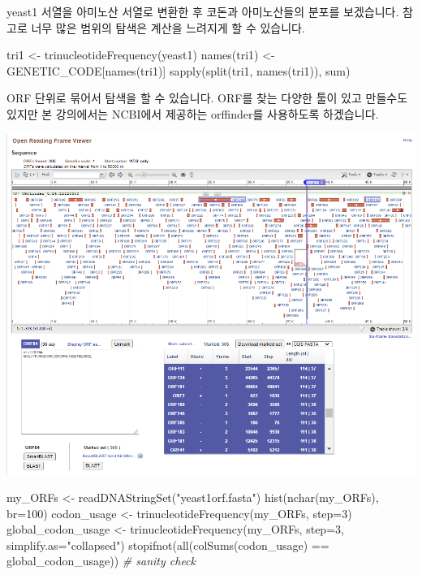 \documentclass[
]{book}
\newenvironment{Shaded}{\begin{snugshade}}{\end{snugshade}}
\newcommand{\AttributeTok}[1]{\textcolor[rgb]{0.77,0.63,0.00}{#1}}
\newcommand{\CommentTok}[1]{\textcolor[rgb]{0.56,0.35,0.01}{\textit{#1}}}
\newcommand{\DecValTok}[1]{\textcolor[rgb]{0.00,0.00,0.81}{#1}}
\newcommand{\FunctionTok}[1]{\textcolor[rgb]{0.00,0.00,0.00}{#1}}
\newcommand{\NormalTok}[1]{#1}
\newcommand{\OtherTok}[1]{\textcolor[rgb]{0.56,0.35,0.01}{#1}}
\newcommand{\SpecialCharTok}[1]{\textcolor[rgb]{0.00,0.00,0.00}{#1}}
\newcommand{\StringTok}[1]{\textcolor[rgb]{0.31,0.60,0.02}{#1}}
\begin{document}
yeast1 서열을 아미노산 서열로 변환한 후 코돈과 아미노산들의 분포를 보겠습니다. 참고로 너무 많은 범위의 탐색은 계산을 느려지게 할 수 있습니다.

\begin{Shaded}
\begin{Highlighting}[]
\NormalTok{tri1 }\OtherTok{\textless{}{-}} \FunctionTok{trinucleotideFrequency}\NormalTok{(yeast1)}
\FunctionTok{names}\NormalTok{(tri1) }\OtherTok{\textless{}{-}}\NormalTok{ GENETIC\_CODE[}\FunctionTok{names}\NormalTok{(tri1)]}
\FunctionTok{sapply}\NormalTok{(}\FunctionTok{split}\NormalTok{(tri1, }\FunctionTok{names}\NormalTok{(tri1)), sum) }
\end{Highlighting}
\end{Shaded}

ORF 단위로 묶어서 탐색을 할 수 있습니다. ORF를 찾는 다양한 툴이 있고 만들수도 있지만 본 강의에서는 NCBI에서 제공하는 orffinder를 사용하도록 하겠습니다.

\includegraphics{images/orffinder.PNG}

\begin{Shaded}
\begin{Highlighting}[]
\NormalTok{my\_ORFs }\OtherTok{\textless{}{-}} \FunctionTok{readDNAStringSet}\NormalTok{(}\StringTok{"yeast1orf.fasta"}\NormalTok{)}
\FunctionTok{hist}\NormalTok{(}\FunctionTok{nchar}\NormalTok{(my\_ORFs), }\AttributeTok{br=}\DecValTok{100}\NormalTok{)}
\NormalTok{codon\_usage }\OtherTok{\textless{}{-}} \FunctionTok{trinucleotideFrequency}\NormalTok{(my\_ORFs, }\AttributeTok{step=}\DecValTok{3}\NormalTok{)}
\NormalTok{global\_codon\_usage }\OtherTok{\textless{}{-}} \FunctionTok{trinucleotideFrequency}\NormalTok{(my\_ORFs, }\AttributeTok{step=}\DecValTok{3}\NormalTok{, }\AttributeTok{simplify.as=}\StringTok{"collapsed"}\NormalTok{)}
\FunctionTok{stopifnot}\NormalTok{(}\FunctionTok{all}\NormalTok{(}\FunctionTok{colSums}\NormalTok{(codon\_usage) }\SpecialCharTok{==}\NormalTok{ global\_codon\_usage))  }\CommentTok{\# sanity check}
\end{Highlighting}
\end{Shaded}
\end{document}
